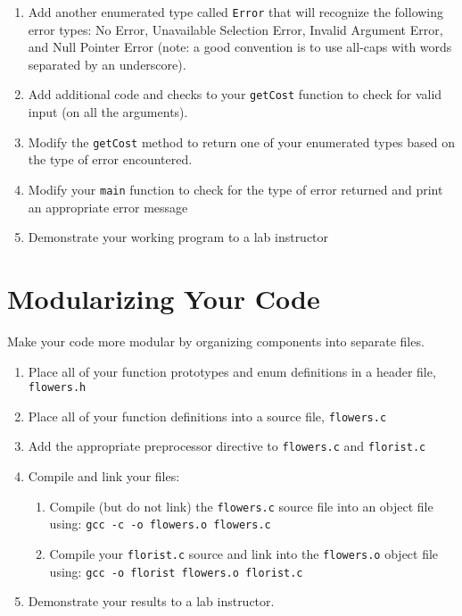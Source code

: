 \documentclass[12pt]{scrartcl}
\begin{document}
\begin{enumerate}
  \item Add another enumerated type called \texttt{Error} that will 
	recognize the following error types: No Error, Unavailable Selection Error, 
	Invalid Argument Error, and Null Pointer Error (note: a good convention 
	is to use all-caps with words separated by an underscore).
  \item Add additional code and checks to your \texttt{getCost} function 
	to check for valid input (on all the arguments).
  \item Modify the \texttt{getCost} method to return one of your enumerated types 
	based on the type of error encountered.
  \item Modify your \texttt{main} function to check for the type of error returned and 
	print an appropriate error message
  \item Demonstrate your working program to a lab instructor
\end{enumerate}
	
\section{Modularizing Your Code}

Make your code more modular by organizing components into separate files.
\begin{enumerate}
  \item Place all of your function prototypes and enum definitions in a 
  	header file, \texttt{flowers.h}
  \item Place all of your function definitions into a source file, \texttt{flowers.c}
  \item Add the appropriate preprocessor directive to \texttt{flowers.c} and \texttt{florist.c}
  \item Compile and link your files:
  \begin{enumerate}
    \item Compile (but do not link) the \texttt{flowers.c} source file 
    	into an object file using: \texttt{gcc -c -o flowers.o flowers.c}
    \item Compile your \texttt{florist.c} source and link into the 
	\texttt{flowers.o} object file using: \texttt{gcc -o florist flowers.o florist.c}
  \end{enumerate}
  \item Demonstrate your results to a lab instructor. 
\end{enumerate}
  
\end{document}
